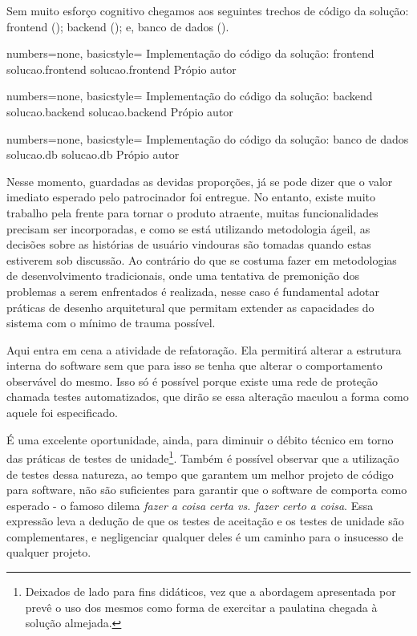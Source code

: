   Sem muito esforço cognitivo chegamos aos seguintes trechos de código da solução: frontend (); backend (); e, banco de dados ().

  \codigo
    {numbers=none, basicstyle=\ttfamily\tiny}
    {Implementação do código da solução: frontend}
    {solucao.frontend}
    {solucao.frontend}
    {Própio autor}

  \codigo
    {numbers=none, basicstyle=\ttfamily\tiny}
    {Implementação do código da solução: backend}
    {solucao.backend}
    {solucao.backend}
    {Própio autor}

  \codigo
    {numbers=none, basicstyle=\ttfamily\tiny}
    {Implementação do código da solução: banco de dados}
    {solucao.db}
    {solucao.db}
    {Própio autor}

  Nesse momento, guardadas as devidas proporções, já se pode dizer que o valor imediato esperado pelo patrocinador foi entregue. No entanto, existe muito trabalho pela frente para tornar o produto atraente, muitas funcionalidades precisam ser incorporadas, e como se está utilizando metodologia ágeil, as decisões sobre as histórias de usuário vindouras são tomadas quando estas estiverem sob discussão. Ao contrário do que se costuma fazer em metodologias de desenvolvimento tradicionais, onde uma tentativa de premonição dos problemas a serem enfrentados é realizada, nesse caso é fundamental adotar práticas de desenho arquitetural que permitam extender as capacidades do sistema com o mínimo de trauma possível.

  Aqui entra em cena a atividade de refatoração. Ela permitirá alterar a estrutura interna do software sem que para isso se tenha que alterar o comportamento observável do mesmo. Isso só é possível porque existe uma rede de proteção chamada testes automatizados, que dirão se essa alteração maculou a forma como aquele foi especificado.

  É uma excelente oportunidade, ainda, para diminuir o débito técnico em torno das práticas de testes de unidade\footnote{Deixados de lado para fins didáticos, vez que a abordagem apresentada por  prevê o uso dos mesmos como forma de exercitar a paulatina chegada à solução almejada.}. Também é possível observar que a utilização de testes dessa natureza, ao tempo que garantem um melhor projeto de código para software, não são suficientes para garantir que o software de comporta como esperado - o famoso dilema \emph{fazer a coisa certa vs. fazer certo a coisa}. Essa expressão leva a dedução de que os testes de aceitação e os testes de unidade são complementares, e negligenciar qualquer deles é um caminho para o insucesso de qualquer projeto.

